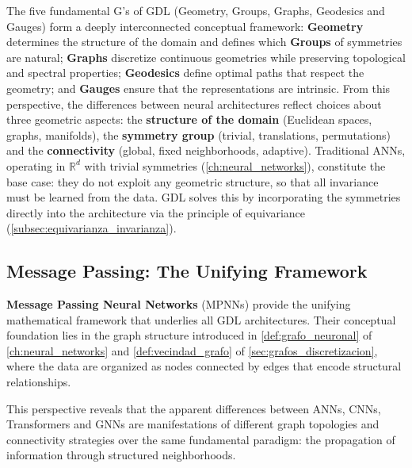 The five fundamental G's of \gls{GDL} (Geometry, Groups, Graphs, Geodesics and Gauges) form a deeply interconnected conceptual framework: \textbf{Geometry} determines the structure of the domain and defines which \textbf{Groups} of symmetries are natural; \textbf{Graphs} discretize continuous geometries while preserving topological and spectral properties; \textbf{Geodesics} define optimal paths that respect the geometry; and \textbf{Gauges} ensure that the representations are intrinsic. From this perspective, the differences between neural architectures reflect choices about three geometric aspects: the \textbf{structure of the domain} (Euclidean spaces, graphs, manifolds), the \textbf{symmetry group} (trivial, translations, permutations) and the \textbf{connectivity} (global, fixed neighborhoods, adaptive). Traditional \glspl{ANN}, operating in $\mathbb{R}^d$ with trivial symmetries (\autoref{ch:neural_networks}), constitute the base case: they do not exploit any geometric structure, so that all invariance must be learned from the data. \gls{GDL} solves this by incorporating the symmetries directly into the architecture via the principle of equivariance (\autoref{subsec:equivarianza_invarianza}).

\subsection{Message Passing: The Unifying Framework}\label{subsec:message_passing_unificador}

\textbf{Message Passing Neural Networks} (\glspl{MPNN}) provide the unifying mathematical framework that underlies all \gls{GDL} architectures. Their conceptual foundation lies in the graph structure introduced in \autoref{def:grafo_neuronal} of \autoref{ch:neural_networks} and \autoref{def:vecindad_grafo} of \autoref{sec:grafos_discretizacion}, where the data are organized as nodes connected by edges that encode structural relationships.

This perspective reveals that the apparent differences between \glspl{ANN}, \glspl{CNN}, \glspl{Transformer} and \glspl{GNN} are manifestations of different graph topologies and connectivity strategies over the same fundamental paradigm: the propagation of information through structured neighborhoods.

